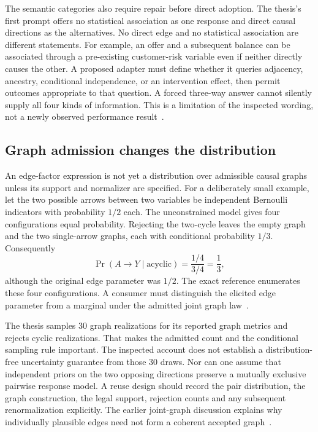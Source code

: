 The semantic categories also require repair before direct adoption. The thesis's first prompt offers no statistical association as one response and direct causal directions as the alternatives. No direct edge and no statistical association are different statements. For example, an offer and a subsequent balance can be associated through a pre-existing customer-risk variable even if neither directly causes the other. A proposed adapter must define whether it queries adjacency, ancestry, conditional independence, or an intervention effect, then permit outcomes appropriate to that question. A forced three-way answer cannot silently supply all four kinds of information. This is a limitation of the inspected wording, not a newly observed performance result~\citep{exec18_videira_thesis}.

\subsection{Graph admission changes the distribution}
An edge-factor expression is not yet a distribution over admissible causal graphs unless its support and normalizer are specified. For a deliberately small example, let the two possible arrows between two variables be independent Bernoulli indicators with probability $1/2$ each. The unconstrained model gives four configurations equal probability. Rejecting the two-cycle leaves the empty graph and the two single-arrow graphs, each with conditional probability $1/3$. Consequently
\begin{equation}
 \Pr(A\to Y\mid\text{acyclic})=\frac{1/4}{3/4}=\frac13,
 \label{exec18:dag-conditioning}
\end{equation}
although the original edge parameter was $1/2$. The exact reference enumerates these four configurations. A consumer must distinguish the elicited edge parameter from a marginal under the admitted joint graph law~\citep{exec18_bayesian_reference}.

The thesis samples 30 graph realizations for its reported graph metrics and rejects cyclic realizations. That makes the admitted count and the conditional sampling rule important. The inspected account does not establish a distribution-free uncertainty guarantee from those 30 draws. Nor can one assume that independent priors on the two opposing directions preserve a mutually exclusive pairwise response model. A reuse design should record the pair distribution, the graph construction, the legal support, rejection counts and any subsequent renormalization explicitly. The earlier joint-graph discussion explains why individually plausible edges need not form a coherent accepted graph~\citep{exec18_videira_thesis}.

